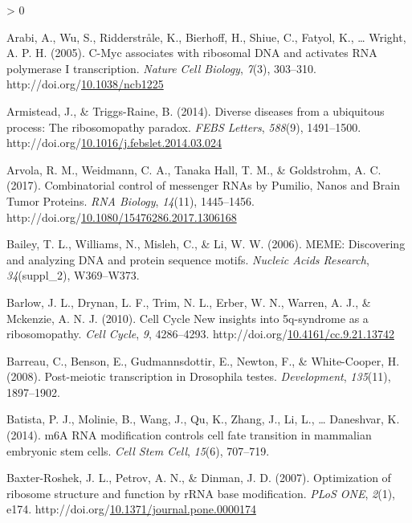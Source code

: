 \documentclass[12pt,oneside]{reedthesis}
\newlength{\cslhangindent}
\newenvironment{CSLReferences}[2] %
 {%
  \setlength{\parindent}{0pt}
  \ifodd #1 \everypar{\setlength{\hangindent}{\cslhangindent}}\ignorespaces\fi
  \ifnum #2 > 0
  \setlength{\parskip}{#2\baselineskip}
  \fi
 }%
 {}
\begin{document}
\begin{CSLReferences}{1}{0}
\leavevmode\hypertarget{ref-arabiCMycAssociatesRibosomal2005}{}%
Arabi, A., Wu, S., Ridderstråle, K., Bierhoff, H., Shiue, C., Fatyol, K., \ldots{} Wright, A. P. H. (2005). C-{Myc} associates with ribosomal {DNA} and activates {RNA} polymerase {I} transcription. \emph{Nature Cell Biology}, \emph{7}(3), 303--310. http://doi.org/\href{https://doi.org/10.1038/ncb1225}{10.1038/ncb1225}

\leavevmode\hypertarget{ref-Armistead2014a}{}%
Armistead, J., \& Triggs-Raine, B. (2014). Diverse diseases from a ubiquitous process: {The} ribosomopathy paradox. \emph{FEBS Letters}, \emph{588}(9), 1491--1500. http://doi.org/\href{https://doi.org/10.1016/j.febslet.2014.03.024}{10.1016/j.febslet.2014.03.024}

\leavevmode\hypertarget{ref-Arvola2017n}{}%
Arvola, R. M., Weidmann, C. A., Tanaka Hall, T. M., \& Goldstrohm, A. C. (2017). Combinatorial control of messenger {RNAs} by {Pumilio}, {Nanos} and {Brain Tumor Proteins}. \emph{RNA Biology}, \emph{14}(11), 1445--1456. http://doi.org/\href{https://doi.org/10.1080/15476286.2017.1306168}{10.1080/15476286.2017.1306168}

\leavevmode\hypertarget{ref-Bailey2006a}{}%
Bailey, T. L., Williams, N., Misleh, C., \& Li, W. W. (2006). {MEME}: Discovering and analyzing {DNA} and protein sequence motifs. \emph{Nucleic Acids Research}, \emph{34}(suppl\_2), W369--W373.

\leavevmode\hypertarget{ref-Barlow2010a}{}%
Barlow, J. L., Drynan, L. F., Trim, N. L., Erber, W. N., Warren, A. J., \& Mckenzie, A. N. J. (2010). Cell {Cycle New} insights into 5q-syndrome as a ribosomopathy. \emph{Cell Cycle}, \emph{9}, 4286--4293. http://doi.org/\href{https://doi.org/10.4161/cc.9.21.13742}{10.4161/cc.9.21.13742}

\leavevmode\hypertarget{ref-Barreau2008d}{}%
Barreau, C., Benson, E., Gudmannsdottir, E., Newton, F., \& White-Cooper, H. (2008). Post-meiotic transcription in {Drosophila} testes. \emph{Development}, \emph{135}(11), 1897--1902.

\leavevmode\hypertarget{ref-Batista2014}{}%
Batista, P. J., Molinie, B., Wang, J., Qu, K., Zhang, J., Li, L., \ldots{} Daneshvar, K. (2014). {m6A RNA} modification controls cell fate transition in mammalian embryonic stem cells. \emph{Cell Stem Cell}, \emph{15}(6), 707--719.

\leavevmode\hypertarget{ref-Baxter-Roshek2007f}{}%
Baxter-Roshek, J. L., Petrov, A. N., \& Dinman, J. D. (2007). Optimization of ribosome structure and function by {rRNA} base modification. \emph{PLoS ONE}, \emph{2}(1), e174. http://doi.org/\href{https://doi.org/10.1371/journal.pone.0000174}{10.1371/journal.pone.0000174}


\end{CSLReferences}
\end{document}
